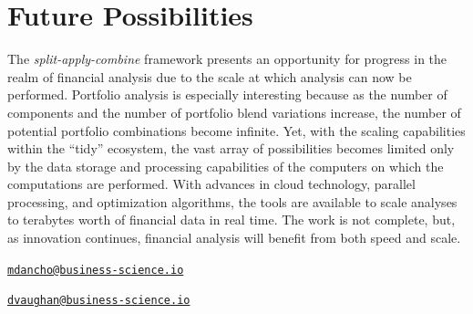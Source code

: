 \hspace{20 mm}

\section{Future Possibilities}\label{future-possibilities}

The \emph{split-apply-combine} framework presents an opportunity for
progress in the realm of financial analysis due to the scale at which
analysis can now be performed. Portfolio analysis is especially
interesting because as the number of components and the number of
portfolio blend variations increase, the number of potential portfolio
combinations become infinite. Yet, with the scaling capabilities within
the ``tidy'' ecosystem, the vast array of possibilities becomes limited
only by the data storage and processing capabilities of the computers on
which the computations are performed. With advances in cloud technology,
parallel processing, and optimization algorithms, the tools are
available to scale analyses to terabytes worth of financial data in real
time. The work is not complete, but, as innovation continues, financial
analysis will benefit from both speed and scale.



\address{%
Matt Dancho\\
Business Science\\
\\
}
\href{mailto:mdancho@business-science.io}{\nolinkurl{mdancho@business-science.io}}

\address{%
Davis Vaughan\\
Business Science\\
\\
}
\href{mailto:dvaughan@business-science.io}{\nolinkurl{dvaughan@business-science.io}}


